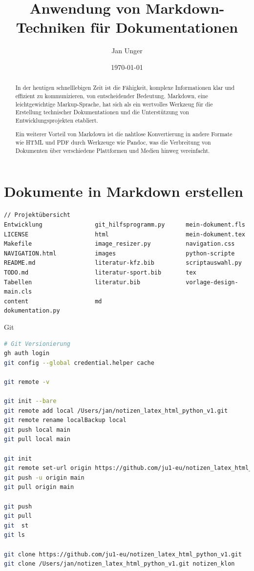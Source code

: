 \documentclass{vorlage-design-main}
\title{Anwendung von Markdown-Techniken für Dokumentationen}
\author{Jan Unger}
\date{\today}
\begin{document}
\maketitle

\begin{abstract}
In der heutigen schnelllebigen Zeit ist die Fähigkeit, komplexe
Informationen klar und effizient zu kommunizieren, von entscheidender
Bedeutung. Markdown, eine leichtgewichtige Markup-Sprache, hat sich als
ein wertvolles Werkzeug für die Erstellung technischer Dokumentationen
und die Unterstützung von Entwicklungsprojekten etabliert.

Ein weiterer Vorteil von Markdown ist die nahtlose Konvertierung in
andere Formate wie HTML und PDF durch Werkzeuge wie Pandoc, was die
Verbreitung von Dokumenten über verschiedene Plattformen und Medien
hinweg vereinfacht.
\end{abstract}

\section{Dokumente in Markdown
erstellen}\label{dokumente-in-markdown-erstellen}

\begin{lstlisting}
// Projektübersicht
Entwicklung               git_hilfsprogramm.py      mein-dokument.fls
LICENSE                   html                      mein-dokument.tex
Makefile                  image_resizer.py          navigation.css
NAVIGATION.html           images                    python-scripte
README.md                 literatur-kfz.bib         scriptauswahl.py
TODO.md                   literatur-sport.bib       tex
Tabellen                  literatur.bib             vorlage-design-main.cls
content                   md
dokumentation.py
\end{lstlisting}

Git

\begin{lstlisting}[language=bash]
# Git Versionierung
gh auth login
git config --global credential.helper cache

git remote -v

git init --bare
git remote add local /Users/jan/notizen_latex_html_python_v1.git
git remote rename localBackup local
git push local main
git pull local main

git init
git remote set-url origin https://github.com/ju1-eu/notizen_latex_html_python_v1.git
git push -u origin main
git pull origin main

git push
git pull
git  st
git ls

git clone https://github.com/ju1-eu/notizen_latex_html_python_v1.git
git clone /Users/jan/notizen_latex_html_python_v1.git notizen_klon
\end{lstlisting}
\end{document}
